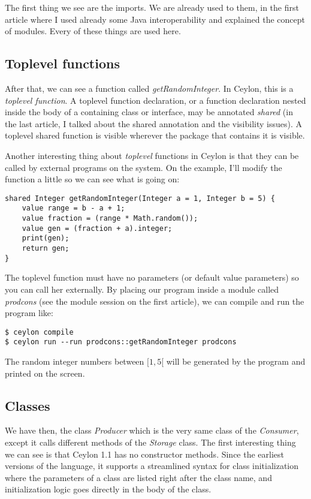 The first thing we see are the imports. We are already used to them, in the
first article where I used already some Java interoperability and explained the
concept of modules. Every of these things are used here.

\subsection{Toplevel functions}

After that, we can see a function called \textit{getRandomInteger}. In Ceylon, this is a
\textit{toplevel function}. A toplevel function declaration, or a function declaration
nested inside the body of a containing class or interface, may be annotated
\textit{shared} (in the last article, I talked about the shared annotation and the
visibility issues). A toplevel shared function is visible wherever the package
that contains it is visible.

Another interesting thing about \textit{toplevel} functions in Ceylon is that they can
be called by external programs on the system. On the example, I'll modify the
function a little so we can see what is going on:

\begin{lstlisting}[label=cri,caption=Ceylon random integer function]
shared Integer getRandomInteger(Integer a = 1, Integer b = 5) {
	value range = b - a + 1;
	value fraction = (range * Math.random());
	value gen = (fraction + a).integer;
	print(gen);
	return gen;
}
\end{lstlisting}


The toplevel function must have no parameters (or default value parameters) so
you can call her externally. By placing our program inside a module called
\textit{prodcons} (see the module session on the first article), we can compile
and run the program like:

\begin{verbatim}
$ ceylon compile
$ ceylon run --run prodcons::getRandomInteger prodcons
\end{verbatim}

The random integer numbers between $[1, 5[$ will be generated by the program and
printed on the screen.

\subsection{Classes}

We have then, the class \textit{Producer} which is the very same class of the
\textit{Consumer}, except it calls different methods of the \textit{Storage} class. The
first interesting thing we can see is that Ceylon 1.1 has no constructor
methods. Since the earliest versions of the language, it supports a streamlined
syntax for class initialization where the parameters of a class are listed right
after the class name, and initialization logic goes directly in the body of the
class\cite{2_2}.

